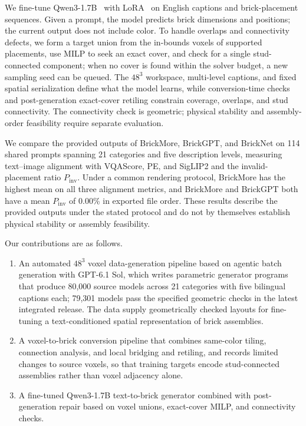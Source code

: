 \documentclass[letterpaper]{article} %
\begin{document}
We fine-tune Qwen3-1.7B~\cite{qwen3} with LoRA~\cite{lora} on English captions and brick-placement sequences. Given a prompt, the model predicts brick dimensions and positions; the current output does not include color. To handle overlaps and connectivity defects, we form a target union from the in-bounds voxels of supported placements, use MILP to seek an exact cover, and check for a single stud-connected component; when no cover is found within the solver budget, a new sampling seed can be queued. The $48^3$ workspace, multi-level captions, and fixed spatial serialization define what the model learns, while conversion-time checks and post-generation exact-cover retiling constrain coverage, overlaps, and stud connectivity. The connectivity check is geometric; physical stability and assembly-order feasibility require separate evaluation.

We compare the provided outputs of BrickMore, BrickGPT, and BrickNet on 114 shared prompts spanning 21 categories and five description levels, measuring text--image alignment with VQAScore, PE, and SigLIP2 and the invalid-placement ratio $P_{\mathrm{inv}}$. Under a common rendering protocol, BrickMore has the highest mean on all three alignment metrics, and BrickMore and BrickGPT both have a mean $P_{\mathrm{inv}}$ of 0.00\% in exported file order. These results describe the provided outputs under the stated protocol and do not by themselves establish physical stability or assembly feasibility.

Our contributions are as follows.
\begin{enumerate}
\item An automated $48^3$ voxel data-generation pipeline based on agentic batch generation with GPT-6.1 Sol, which writes parametric generator programs that produce 80,000 source models across 21 categories with five bilingual captions each; 79,301 models pass the specified geometric checks in the latest integrated release. The data supply geometrically checked layouts for fine-tuning a text-conditioned spatial representation of brick assemblies.
\item A voxel-to-brick conversion pipeline that combines same-color tiling, connection analysis, and local bridging and retiling, and records limited changes to source voxels, so that training targets encode stud-connected assemblies rather than voxel adjacency alone.
\item A fine-tuned Qwen3-1.7B text-to-brick generator combined with post-generation repair based on voxel unions, exact-cover MILP, and connectivity checks.
\end{enumerate}
\end{document}
